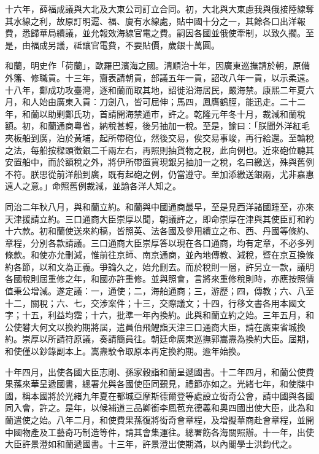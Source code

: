 \begin{pinyinscope}
十六年，薛福成議與大北及大東公司訂立合同。初，大北與大東慮我與俄接陸線奪其水線之利，故原訂明滬、福、廈有水線處，貼中國十分之一，其餘各口出洋報費，悉歸華局續議，並允報效海線官電之費。嗣因各國並俄使牽制，以致久擱。至是，由福成另議，祗讓官電費，不要貼價，歲銀十萬圓。

和蘭，明史作「荷蘭」，歐羅巴濱海之國。清順治十年，因廣東巡撫請於朝，原備外籓、修職貢。十三年，齎表請朝貢，部議五年一貢，詔改八年一貢，以示柔遠。十八年，鄭成功攻臺灣，逐和蘭而取其地，詔徙沿海居民，嚴海禁。康熙二年夏六月，和人始由廣東入貢：刀劍八，皆可屈伸；馬四，鳳膺鶴脛，能迅走。二十二年，和蘭以助剿鄭氏功，首請開海禁通市，許之。乾隆元年冬十月，裁減和蘭稅額。初，和蘭通商粵省，納稅甚輕，後另抽加一稅。至是，諭曰：「朕聞外洋紅毛夾板船到廣，泊於黃埔，起所帶砲位，然後交易，俟交易事竣，再行給還。至輸稅之法，每船按樑頭徵銀二千兩左右，再照則抽貨物之稅，此向例也。近來砲位聽其安置船中，而於額稅之外，將伊所帶置貨現銀另抽加一之稅，名曰繳送，殊與舊例不符。朕思從前洋船到廣，既有起砲之例，仍當遵守。至加添繳送銀兩，尤非嘉惠遠人之意。」命照舊例裁減，並諭各洋人知之。

同治二年秋八月，與和蘭立約。和蘭與中國通商最早，至是見西洋諸國踵至，亦來天津援請立約。三口通商大臣崇厚以聞，朝議許之，即命崇厚在津與其使臣訂和約十六款。初和蘭使送來約稿，皆照英、法各國及參用續立之布、西、丹國等條約、章程，分別各款請議。三口通商大臣崇厚答以現在各口通商，均有定章，不必多列條款。和使亦允刪減，惟前往京師、南京通商，並內地傳教、減稅，暨在京互換條約各節，以和文為正義。爭論久之，始允刪去。而於稅則一層，許另立一款，議明各國稅則屆重修之年，和國亦許重修。並與照會，言將來重修稅則時，亦應按照價值秉公增減。遂定議：一，通使；二，海舶通商；三，游歷；四，傳教；六、八至十二，關稅；六、七，交涉案件；十三，交際議文；十四，行移文書各用本國文字；十五，利益均霑；十六，批準一年內換約。此與和蘭立約之始。三年五月，和公使礬大何文以換約期將屆，遣員伯飛鯉詣天津三口通商大臣，請在廣東省城換約。崇厚以所請符原議，奏請簡員往。朝廷命廣東巡撫郭嵩燾為換約大臣。屆期，和使僅以鈔錄副本上。嵩燾駮令取原本再定換約期。逾年始換。

十年四月，出使各國大臣志剛、孫家穀詣和蘭呈遞國書。十二年四月，和蘭公使費果蓀來華呈遞國書，總署允與各國使臣同覲見，禮節亦如之。光緒七年，和使牒中國，稱本國將於光緒九年夏在都城亞摩斯德爾登等處設立衒奇公會，請中國與各國同入會，許之。是年，以候補道三品卿銜李鳳苞充德義和奧四國出使大臣，此為和蘭遣使之始。八年二月，和使費果蓀復將衒奇會章程，及增擬華商赴會章程，並開中國物產及工藝奇巧制造等件，請其會集運往。總署飭各海關照辦。十一年，出使大臣許景澄如和蘭遞國書。十三年，許景澄出使期滿，以內閣學士洪鈞代之。


\end{pinyinscope}
